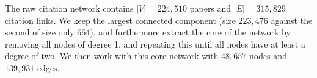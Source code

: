 \documentclass[10pt]{article}
\begin{document}



The raw citation network contains $\left|V\right| = 224,510$ papers and $\left|E\right| = 315,829$ citation links. We keep the largest connected component (size $223,476$ against the second of size only $664$), and furthermore extract the core of the network by removing all nodes of degree 1, and repeating this until all nodes have at least a degree of two. We then work with this core network with $48,657$ nodes and $139,931$ edges.








\end{document}
